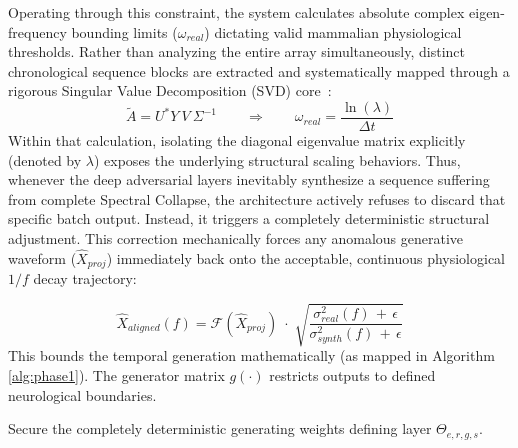 \documentclass[journal]{IEEEtran}
\begin{document}
Operating through this constraint, the system calculates absolute complex eigen-frequency bounding limits ($\omega_{real}$) dictating valid mammalian physiological thresholds. Rather than analyzing the entire array simultaneously, distinct chronological sequence blocks are extracted and systematically mapped through a rigorous Singular Value Decomposition (SVD) core~\cite{tarailis2024functional}:
\begin{equation}
    \tilde{A} = U^* Y \: V \: \Sigma^{-1} \qquad \Longrightarrow \qquad \omega_{real} = \frac{\ln \left( \lambda \right)}{\Delta t}
\end{equation}
Within that calculation, isolating the diagonal eigenvalue matrix explicitly (denoted by $\lambda$) exposes the underlying structural scaling behaviors. Thus, whenever the deep adversarial layers inevitably synthesize a sequence suffering from complete Spectral Collapse, the architecture actively refuses to discard that specific batch output. Instead, it triggers a completely deterministic structural adjustment. This correction mechanically forces any anomalous generative waveform ($\hat{X}_{proj}$) immediately back onto the acceptable, continuous physiological $1/f$ decay trajectory:

\begin{equation}
    \hat{X}_{aligned} \left( f \right) = \mathcal{F} \left( \hat{X}_{proj} \right) \; \cdot \; \sqrt{ \frac{\sigma^2_{real}(f) \,+\, \epsilon}{\sigma^2_{synth}(f) \,+\, \epsilon} }
\end{equation}
This bounds the temporal generation mathematically (as mapped in Algorithm \ref{alg:phase1}). The generator matrix $g(\cdot)$ restricts outputs to defined neurological boundaries.

\begin{algorithm}[th]
\caption{DMD-bounded AC-TimeGAN Execution}
\label{alg:phase1}
Secure the completely deterministic generating weights defining layer $\Theta_{e, r, g, s}$.
\end{algorithm}
\end{document}
